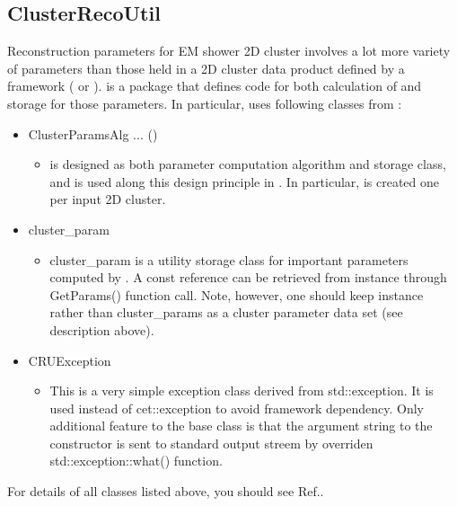 \subsection{{\ttfamily ClusterRecoUtil}}
\label{sec:fmwk:external:cru}
Reconstruction parameters for EM shower 2D cluster involves a lot more variety of parameters than those held in a 2D cluster data product defined by a framework ({\larsoft} or {\larlight}). {\cru} is a package that defines code for both calculation of and storage for those parameters. In particular, {\cmtool} uses following {\CPP} classes from {\cru}:
\begin{itemize}
\item {\ttfamily ClusterParamsAlg ... (\cpan)}
  \begin{itemize}
    \item {\cpan} is designed as both parameter computation algorithm and storage class, and is used along this design principle in {\cmtool}. In particular, {\cpan} is created one per input 2D cluster.
  \end{itemize}
\item {\ttfamily cluster\_param}
  \begin{itemize}
    \item {\ttfamily cluster\_param} is a utility storage class for important parameters computed by \cpan. A const reference can be retrieved from {\cpan} instance through {\ttfamily GetParams()} function call. Note, however, one should keep {\cpan} instance rather than {\ttfamily cluster\_params} as a cluster parameter data set (see {\cpan} description above).
  \end{itemize}
\item {\ttfamily CRUException}
  \begin{itemize}
    \item This is a very simple exception class derived from {\ttfamily std::exception}. It is used instead of {\ttfamily cet::exception} to avoid framework dependency. Only additional feature to the base class is that the argument string to the constructor is sent to standard output streem by overriden {\ttfamily std::exception::what()} function.
  \end{itemize}
\end{itemize}

For details of all classes listed above, you should see Ref.\cite{ClusterRecoUtil}.

